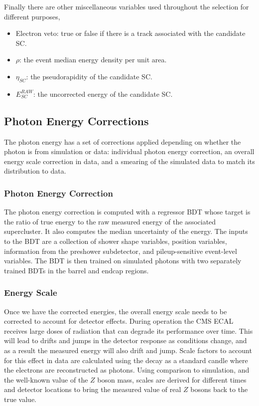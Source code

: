Finally there are other miscellaneous variables used throughout the selection for different purposes,
\begin{itemize}[leftmargin=.5in,noitemsep]
    \item Electron veto: true or false if there is a track associated with the candidate SC.
    \item $\rho$: the event median energy density per unit area.
    \item $\eta_{SC}$: the pseudorapidity of the candidate SC.
    \item $E_{SC}^{RAW}$: the uncorrected energy of the candidate SC.
\end{itemize}



\subsection{Photon Energy Corrections}

The photon energy has a set of corrections applied depending on whether the photon is from simulation or data: individual photon energy correction, an overall energy scale correction in data, and a smearing of the simulated data to match its distribution to data. 

\subsubsection{Photon Energy Correction}
The photon energy correction is computed with a regressor BDT whose target is the ratio of true energy to the raw measured energy of the associated supercluster. It also computes the median uncertainty of the energy. 
The inputs to the BDT are a collection of shower shape variables, position variables, information from the preshower subdetector, and pileup-sensitive event-level variables.
The BDT is then trained on simulated photons with two separately trained BDTs in the barrel and endcap regions. 


\subsubsection{Energy Scale}
Once we have the corrected energies, the overall energy scale needs to be corrected to account for detector effects. 
During operation the CMS ECAL receives large doses of radiation that can degrade its performance over time. 
This will lead to drifts and jumps in the detector response as conditions change, and as a result the measured energy will also drift and jump. 
Scale factors to account for this effect in data are calculated using the \Zee decay as a standard candle where the electrons are reconstructed as photons. 
Using comparison to simulation, and the well-known value of the $Z$ boson mass, scales are derived for different times and detector locations to bring the measured value of real $Z$ bosons back to the true value. 


